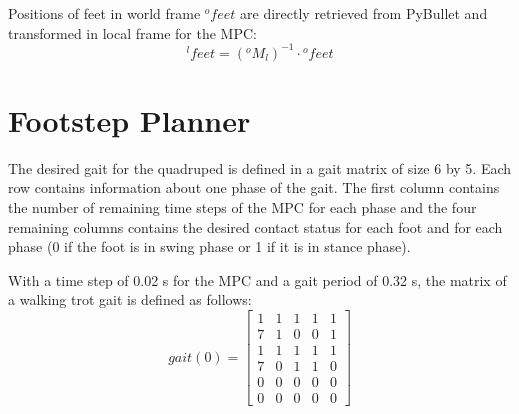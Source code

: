 \documentclass[a4paper,11pt]{article}
\newcommand{\fM}[2]{{}^{#1}\!M_{#2}}
\begin{document}
Positions of feet in world frame ${}^o\!feet$ are directly retrieved from PyBullet and transformed in local frame for the MPC:
\begin{equation}
{}^l\!feet = (\fM{o}{l})^{-1} \cdot {}^o\!feet
\end{equation} 

\newpage
\section*{Footstep Planner}

The desired gait for the quadruped is defined in a gait matrix of size 6 by 5. Each row contains information about one phase of the gait. The first column contains the number of remaining time steps of the MPC for each phase and the four remaining columns contains the desired contact status for each foot and for each phase (0 if the foot is in swing phase or 1 if it is in stance phase).

With a time step of 0.02 s for the MPC and a gait period of 0.32 s, the matrix of a walking trot gait is defined as follows:
\begin{equation}
gait(0) = \begin{bmatrix} 
1 & 1 & 1 & 1 & 1 \\
7 & 1 & 0 & 0 & 1 \\
1 & 1 & 1 & 1 & 1 \\
7 & 0 & 1 & 1 & 0 \\
0 & 0 & 0 & 0 & 0 \\
0 & 0 & 0 & 0 & 0 \end{bmatrix} \label{eq:gait0}
\end{equation}
\end{document}
